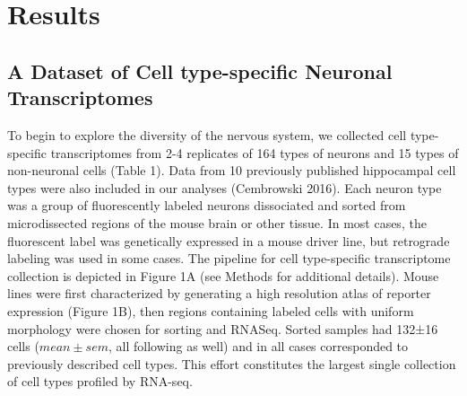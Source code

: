\section{Results}

\subsection{A Dataset of Cell type-specific Neuronal Transcriptomes}
To begin to explore the diversity of the nervous system, we collected cell type-specific transcriptomes from 2-4 replicates of 164 types of neurons and 15 types of non-neuronal cells (Table 1). Data from 10 previously published hippocampal cell types were also included in our analyses (Cembrowski 2016). Each neuron type was a group of fluorescently labeled neurons dissociated and sorted from microdissected regions of the mouse brain or other tissue. In most cases, the fluorescent label was genetically expressed in a mouse driver line, but retrograde labeling was used in some cases. The pipeline for cell type-specific transcriptome collection is depicted in Figure 1A (see Methods for additional details). Mouse lines were first characterized by generating a high resolution atlas of reporter expression (Figure 1B), then regions containing labeled cells with uniform morphology were chosen for sorting and RNASeq. Sorted samples had 132±16 cells ($mean\pm sem$, all following as well) and in all cases corresponded to previously described cell types. This effort constitutes the largest single collection of cell types profiled by RNA-seq.

